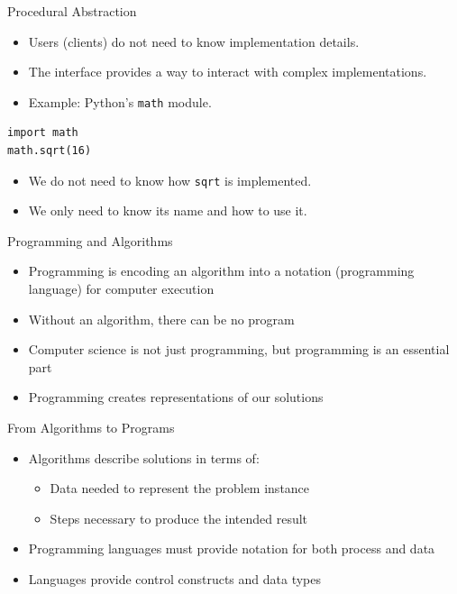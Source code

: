 \documentclass{beamer}
\begin{document}
\begin{frame}[fragile]{Procedural Abstraction}
    \begin{itemize}
        \item Users (clients) do not need to know implementation details.
        \item The interface provides a way to interact with complex implementations.
        \item Example: Python's \texttt{math} module.
    \end{itemize}

    \vspace{0.5cm} %

    
    \begin{lstlisting}
import math
math.sqrt(16)
    \end{lstlisting}

    \vspace{0.5cm} %

    \begin{itemize}
        \item We do not need to know how \texttt{sqrt} is implemented.
        \item We only need to know its name and how to use it.
    \end{itemize}
\end{frame}

\begin{frame}{Programming and Algorithms}
    \begin{itemize}
        \item Programming is encoding an algorithm into a notation (programming language) for computer execution
        \item Without an algorithm, there can be no program
        \item Computer science is not just programming, but programming is an essential part
        \item Programming creates representations of our solutions
    \end{itemize}
\end{frame}

\begin{frame}{From Algorithms to Programs}
    \begin{itemize}
        \item Algorithms describe solutions in terms of:
        \begin{itemize}
            \item Data needed to represent the problem instance
            \item Steps necessary to produce the intended result
        \end{itemize}
        \item Programming languages must provide notation for both process and data
        \item Languages provide control constructs and data types
    \end{itemize}
\end{frame}
\end{document}
